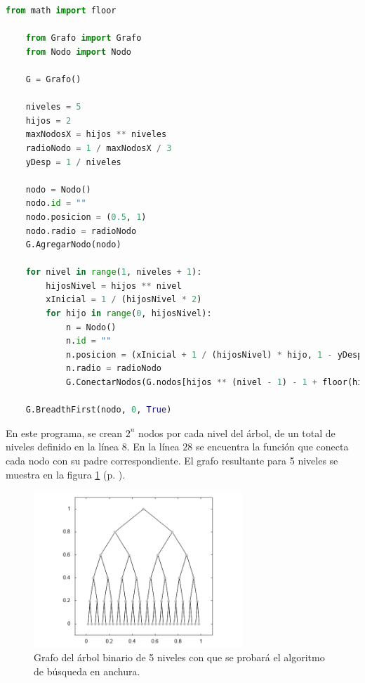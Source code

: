 \documentclass{article}
\begin{document}
  \begin{lstlisting}[language=Python]
    from math import floor

    from Grafo import Grafo
    from Nodo import Nodo

    G = Grafo()

    niveles = 5
    hijos = 2
    maxNodosX = hijos ** niveles
    radioNodo = 1 / maxNodosX / 3
    yDesp = 1 / niveles

    nodo = Nodo()
    nodo.id = ""
    nodo.posicion = (0.5, 1)
    nodo.radio = radioNodo
    G.AgregarNodo(nodo)

    for nivel in range(1, niveles + 1):
        hijosNivel = hijos ** nivel
        xInicial = 1 / (hijosNivel * 2)
        for hijo in range(0, hijosNivel):
            n = Nodo()
            n.id = ""
            n.posicion = (xInicial + 1 / (hijosNivel) * hijo, 1 - yDesp * nivel)
            n.radio = radioNodo
            G.ConectarNodos(G.nodos[hijos ** (nivel - 1) - 1 + floor(hijo / hijos)], n)

    G.BreadthFirst(nodo, 0, True)
  \end{lstlisting}

  En este programa, se crean $2^n$ nodos por cada nivel del árbol, de un total de niveles definido en la línea $8$. En la línea $28$ se encuentra la función que conecta cada nodo con su padre correspondiente. El grafo resultante para 5 niveles se muestra en la figura \ref{arbolBinario} (p. \pageref{arbolBinario}).

  \begin{figure}[h]
    \includegraphics[width=0.7\textwidth]{arbolBinario}
    \centering
    \caption{Grafo del árbol binario de 5 niveles con que se probará el algoritmo de búsqueda en anchura.}
    \label{arbolBinario}
  \end{figure}
\end{document}

